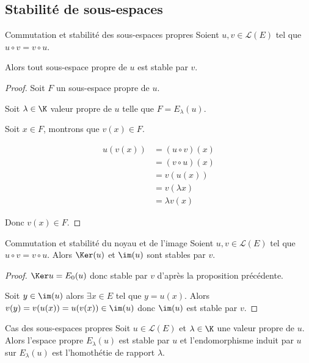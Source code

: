 \subsection{Stabilité de sous-espaces }

\begin{proposition}{Commutation et stabilité des sous-espaces propres}{}
    Soient $u, v \in \mathscr L(E)$ tel que $u \circ v = v \circ u$.

    Alors tout sous-espace propre de $u$ est stable par $v$.
\end{proposition}

\begin{proof}
    Soit $F$ un sous-espace propre de $u$. 

    Soit $\lambda \in \K$ valeur propre de $u$ telle que $F = E_\lambda(u)$.

    Soit $x \in F$, montrons que $v(x) \in F$.

    \begin{align}
        u(v(x)) & = (u \circ v)(x) \\
                & = (v \circ u)(x) \\
                & = v(u(x)) \\
                & = v(\lambda x) \\
                & = \lambda v(x)
    \end{align}

    Donc $v(x) \in F$.
\end{proof}

\begin{proposition}{Commutation et stabilité du noyau et de l'image}{}
    Soient $u, v \in \mathscr L(E)$ tel que $u \circ v = v \circ u$. Alors $\Ker(u)$ et
    $\im(u)$ sont stables par $v$.
\end{proposition}

\begin{proof}
    $\Ker u = E_0(u)$ donc stable par $v$ d'après la proposition précédente.

    Soit $y \in \im(u)$ alors $\exists x \in E$ tel que $y = u(x)$. Alors 
    $v(y) = v(u(x)) = u(v(x)) \in \im(u)$ donc $\im(u)$ est stable par $v$.
\end{proof}

\begin{proposition}{Cas des sous-espaces propres}{}
    Soit $u \in \mathscr L(E)$ et $\lambda \in \K$ une valeur propre de $u$. 
    Alors l'espace propre $E_\lambda(u)$ est stable par $u$ et l'endomorphisme induit par $u$ 
    sur $E_\lambda(u)$ est l'homothétie de rapport $\lambda$.
\end{proposition}

